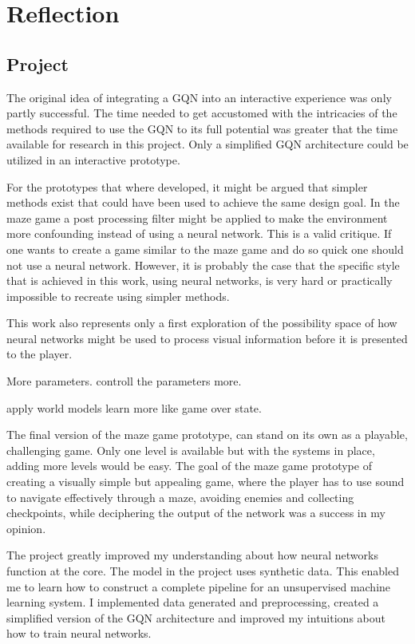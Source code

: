 
\chapter{Reflection}
\section{Project}
The original idea of integrating a GQN into an interactive experience was only partly successful. The time needed to get accustomed with the intricacies of the methods required to use the GQN to its full potential was greater that the time available for research in this project. Only a simplified GQN architecture could be utilized in an interactive prototype.

For the prototypes that where developed, it might be argued that simpler methods exist that could have been used to achieve the same design goal. In the maze game a post processing filter might be applied to make the environment more confounding instead of using a neural network. This is a valid critique. If one wants to create a game similar to the maze game and do so quick one should not use a neural network. However, it is probably the case that the specific style that is achieved in this work, using neural networks, is very hard or practically impossible to recreate using simpler methods.

This work also represents only a first exploration of the possibility space of how neural networks might be used to process visual information before it is presented to the player.

More parameters. controll the parameters more.

apply world models \cite{Ha2018-dd} learn more like game over state.

The final version of the maze game prototype, can stand on its own as a playable, challenging game. Only one level is available but with the systems in place, adding more levels would be easy. The goal of the maze game prototype of creating a visually simple but appealing game, where the player has to use sound to navigate effectively through a maze, avoiding enemies and collecting checkpoints, while deciphering the output of the network was a success in my opinion.

The project greatly improved my understanding about how neural networks function at the core. The model in the project uses synthetic data. This enabled me to learn how to construct a complete pipeline for an unsupervised machine learning system. I implemented data generated and preprocessing, created a simplified version of the GQN architecture and improved my intuitions about how to train neural networks.

